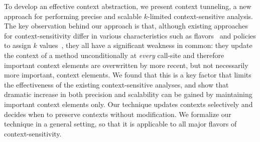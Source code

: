 


To develop an effective context abstraction, we present context tunneling, a new approach for
performing precise and scalable $k$-limited context-sensitive 
analysis. The key observation behind our approach is that, although
existing approaches for context-sensitivity differ in various
characteristics such as
flavors~\cite{Shivers1988,Milanova2005,Smaragdakis2011,KastrinisS13a}
and policies to assign $k$ values~\cite{Smaragdakis2014,JeJeChOh17,Oh2014},
they all have a significant weakness in common: they update the
context of a method unconditionally at {\em every} call-site and therefore important
context elements are overwritten by more recent, but not necessarily
more important, context elements. We found that this is a key factor
that limits the effectiveness of the existing context-sensitive
analyses, and show that dramatic increase in both precision and
scalability can be gained by maintaining important context elements
only. Our technique updates contexts selectively and decides when to
preserve contexts without modification. 
We formalize our technique in a general setting, so that it is
applicable to all major flavors of context-sensitivity.


